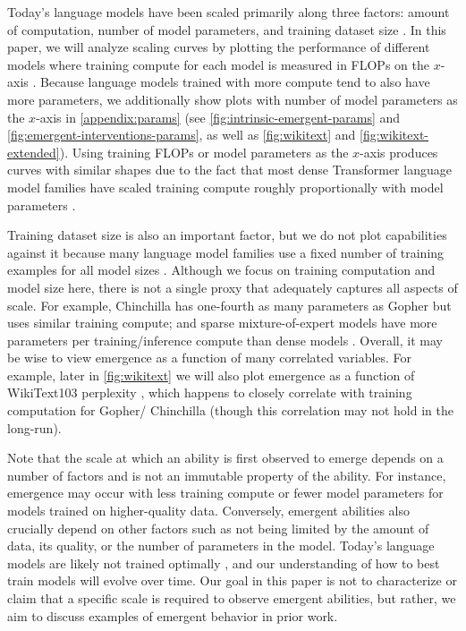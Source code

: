 \documentclass[10pt]{article} %
\begin{document}
Today's language models have been scaled primarily along three factors: amount of computation, number of model parameters, and training dataset size \citep{kaplan2020scaling,hoffmann2022training}.
In this paper, we will analyze scaling curves by plotting the performance of different models where training compute for each model is measured in FLOPs on the $x$-axis \citep{hoffmann2022training}.
Because language models trained with more compute tend to also have more parameters, we additionally show plots with number of model parameters as the $x$-axis in \cref{appendix:params} (see \cref{fig:intrinsic-emergent-params} and \cref{fig:emergent-interventions-params}, as well as \cref{fig:wikitext} and \cref{fig:wikitext-extended}).
Using training FLOPs or model parameters as the $x$-axis produces curves with similar shapes due to the fact that most dense Transformer language model families have scaled training compute roughly proportionally with model parameters \citep{kaplan2020scaling}.

Training dataset size is also an important factor, but we do not plot capabilities against it because many language model families use a fixed number of training examples for all model sizes \citep{brown2020language,rae2021scaling,chowdhery2022palm}.
Although we focus on training computation and model size here, there is not a single proxy that adequately captures all aspects of scale.
For example, Chinchilla \citep{hoffmann2022training} has one-fourth as many parameters as Gopher \citep{rae2021scaling} but uses similar training compute; and sparse mixture-of-expert models have more parameters per training/inference compute than dense models \citep{fedus2021switch,du2021glam}.
Overall, it may be wise to view emergence as a function of many correlated variables.
For example, later in \cref{fig:wikitext} we will also plot emergence as a function of WikiText103 perplexity \citep{merity2016pointer}, which happens to closely correlate with training computation for Gopher/ Chinchilla (though this correlation may not hold in the long-run).

Note that the scale at which an ability is first observed to emerge depends on a number of factors and is not an immutable property of the ability. 
For instance, emergence may occur with less training compute or fewer model parameters for models trained on higher-quality data.
Conversely, emergent abilities also crucially depend on other factors such as not being limited by the amount of data, its quality, or the number of parameters in the model.
Today's language models are likely not trained optimally \citep{hoffmann2022training}, and our understanding of how to best train models will evolve over time.
Our goal in this paper is not to characterize or claim that a specific scale is required to observe emergent abilities, but rather, we aim to discuss examples of emergent behavior in prior work.
\end{document}
